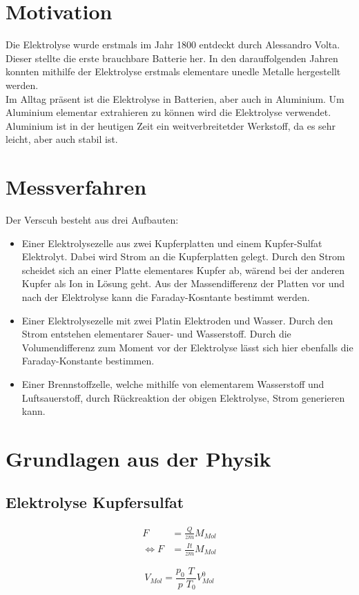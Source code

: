 \section{Motivation}

Die Elektrolyse wurde erstmals im Jahr 1800 entdeckt durch Alessandro Volta. Dieser stellte die erste brauchbare Batterie her.
In den darauffolgenden Jahren konnten mithilfe der Elektrolyse erstmals elementare unedle Metalle hergestellt werden. \\
Im Alltag präsent ist die Elektrolyse in Batterien, aber auch in Aluminium.
Um Aluminium elementar extrahieren zu können wird die Elektrolyse verwendet. Aluminium ist in der heutigen Zeit ein weitverbreitetder
Werkstoff, da es sehr leicht, aber auch stabil ist.

\section{Messverfahren}
Der Verscuh besteht aus drei Aufbauten:\\
\begin{itemize}
    \item Einer Elektrolysezelle aus zwei Kupferplatten und einem Kupfer-Sulfat Elektrolyt. Dabei wird Strom an die Kupferplatten gelegt. Durch den Strom
    scheidet sich an einer Platte elementares Kupfer ab, wärend bei der anderen Kupfer als Ion in Lösung geht. Aus der Massendifferenz der Platten vor und nach der Elektrolyse kann die Faraday-Kosntante bestimmt werden.
    \item Einer Elektrolysezelle mit zwei Platin Elektroden und Wasser. Durch den Strom entstehen elementarer Sauer- und Wasserstoff. Durch die Volumendifferenz zum Moment vor der Elektrolyse
    lässt sich hier ebenfalls die Faraday-Konstante bestimmen.
    \item Einer Brennstoffzelle, welche mithilfe von elementarem Wasserstoff und Luftsauerstoff, durch Rückreaktion der obigen Elektrolyse, Strom generieren kann.
\end{itemize}



\section{Grundlagen aus der Physik}

\subsection{Elektrolyse Kupfersulfat}

\begin{align}
    F &= \frac{Q}{zm}M_{Mol} \\
    \Leftrightarrow F &=  \frac{It}{zm}M_{Mol}
\end{align}

\begin{equation}
    V_{Mol} = \frac{p_0}{p}\frac{T}{T_0}V_{Mol}^0
\end{equation}